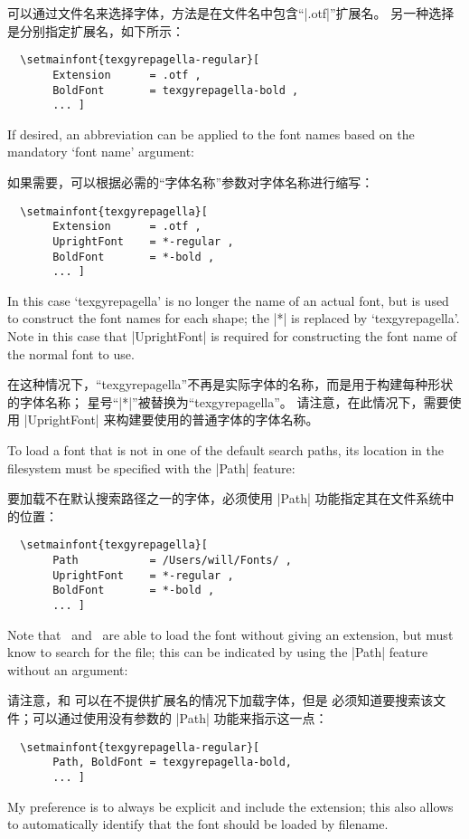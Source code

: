 \documentclass[a4paper]{l3doc}
\begin{document}
 可以通过文件名来选择字体，方法是在文件名中包含“|.otf|”扩展名。
另一种选择是分别指定扩展名，如下所示：

\begin{Verbatim}
  \setmainfont{texgyrepagella-regular}[
       Extension      = .otf ,
       BoldFont       = texgyrepagella-bold ,
       ... ]
\end{Verbatim}
If desired, an abbreviation can be applied to the font names based on the
mandatory `font name' argument:

如果需要，可以根据必需的“字体名称”参数对字体名称进行缩写：
\begin{Verbatim}
  \setmainfont{texgyrepagella}[
       Extension      = .otf ,
       UprightFont    = *-regular ,
       BoldFont       = *-bold ,
       ... ]
\end{Verbatim}
In this case `texgyrepagella' is no longer the name of an actual font,
but is used to construct the font names for each shape;
the |*| is replaced by `texgyrepagella'.
Note in this case that |UprightFont| is required for constructing the font
name of the normal font to use.

在这种情况下，“texgyrepagella”不再是实际字体的名称，而是用于构建每种形状的字体名称；
星号“|*|”被替换为“texgyrepagella”。
请注意，在此情况下，需要使用 |UprightFont| 来构建要使用的普通字体的字体名称。


To load a font that is not in one of the default search paths, its location
in the filesystem must be specified with the |Path| feature:

要加载不在默认搜索路径之一的字体，必须使用 |Path| 功能指定其在文件系统中的位置：
\begin{Verbatim}
  \setmainfont{texgyrepagella}[
       Path           = /Users/will/Fonts/ ,
       UprightFont    = *-regular ,
       BoldFont       = *-bold ,
       ... ]
\end{Verbatim}
Note that \XeTeX\ and \LuaTeX\ are able to load the font without giving an
extension, but  must know to search for the file; this can be
indicated by using the |Path| feature without an argument:

请注意，\XeTeX 和 \LuaTeX 可以在不提供扩展名的情况下加载字体，但是  必须知道要搜索该文件；可以通过使用没有参数的 |Path| 功能来指示这一点：

\begin{Verbatim}
  \setmainfont{texgyrepagella-regular}[
       Path, BoldFont = texgyrepagella-bold,
       ... ]
\end{Verbatim}
My preference is to always be explicit and include the extension; this also allows  to automatically identify that the font should be loaded by filename.
\end{document}
